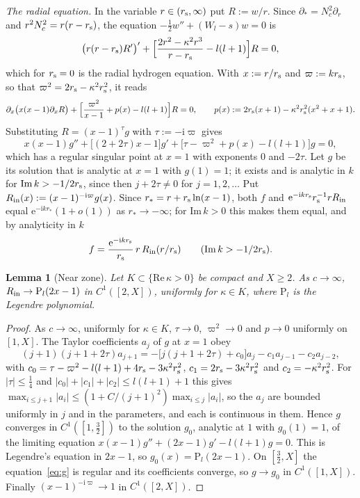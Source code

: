 \documentclass[%
 aip,
 jmp,
 amsmath,amssymb,
 reprint, onecolumn
]{revtex4-1}
\newtheorem{alemma}{Lemma}
\theoremstyle{definition}
\theoremstyle{remark}
\newcommand{\rmi}{\mathrm{i}}
\newcommand{\rme}{\mathrm{e}}
\begin{document}
\emph{The radial equation.} In the variable $r\in(r_{\rm s},\infty)$ put
$R:=w/r$. Since $\partial_*=N_c^2\partial_r$ and $r^2N_c^2=r(r-r_{\rm
s})$, the equation $-\frac12w''+(W_l-s)w=0$ is
\begin{equation}\label{eq:radial-R}
\bigl(r(r-r_{\rm s})R'\bigr)'+\Bigl[\frac{2r^2-\kappa^2r^3}{r-r_{\rm s}}-l(l+1)\Bigr]R=0 ,
\end{equation}
which for $r_{\rm s}=0$ is the radial hydrogen equation. With
$x:=r/r_{\rm s}$ and $\varpi:=kr_{\rm s}$, so that
$\varpi^2=2r_{\rm s}-\kappa^2r_{\rm s}^2$, it reads
\[
\partial_x\bigl(x(x-1)\partial_xR\bigr)+\Bigl[\frac{\varpi^2}{x-1}+p(x)
-l(l+1)\Bigr]R=0,\qquad p(x):=2r_{\rm s}(x+1)-\kappa^2r_{\rm s}^2(x^2+x+1).
\]
Substituting $R=(x-1)^{\tau}g$ with $\tau:=-\rmi\varpi$ gives
\begin{equation}\label{eq:g}
x(x-1)g''+\bigl[(2+2\tau)x-1\bigr]g'+\bigl[\tau-\varpi^2+p(x)-l(l+1)\bigr]
g=0,
\end{equation}
which has a regular singular point at $x=1$ with exponents $0$ and
$-2\tau$. Let $g$ be its solution that is analytic at $x=1$ with
$g(1)=1$; it exists and is analytic in $k$ for
$\mathrm{Im}\,k>-1/2r_{\rm s}$, since then $j+2\tau\neq0$ for
$j=1,2,\dots$ Put $R_{\rm in}(x):=(x-1)^{-\rmi\varpi}g(x)$. Since
$r_*=r+r_{\rm s}\ln(x-1)$, both $f$ and
$\rme^{-\rmi kr_{\rm s}}r_{\rm s}^{-1}rR_{\rm in}$ equal
$\rme^{-\rmi kr_*}(1+o(1))$ as $r_*\to-\infty$; for $\mathrm{Im}\,k>0$
this makes them equal, and by analyticity in $k$
\begin{equation}\label{eq:f-near}
f=\frac{\rme^{-\rmi kr_{\rm s}}}{r_{\rm s}}\,r\,R_{\rm in}(r/r_{\rm s})
\qquad(\mathrm{Im}\,k>-1/2r_{\rm s}).
\end{equation}

\begin{alemma}[Near zone]\label{lem:near}
Let $K\subset\{\mathrm{Re}\,\kappa>0\}$ be compact and $X\geq2$. As
$c\to\infty$, $R_{\rm in}\to\mathrm P_l(2x-1)$ in $C^1([2,X])$,
uniformly for $\kappa\in K$, where $\mathrm P_l$ is the Legendre
polynomial.
\end{alemma}

\begin{proof}
As $c\to\infty$, uniformly for $\kappa\in K$, $\tau\to0$,
$\varpi^2\to0$ and $p\to0$ uniformly on $[1,X]$. The Taylor coefficients
$a_j$ of $g$ at $x=1$ obey
\[
(j+1)(j+1+2\tau)a_{j+1}=-\bigl[j(j+1+2\tau)+c_0\bigr]a_j-c_1a_{j-1}
-c_2a_{j-2},
\]
with $c_0=\tau-\varpi^2-l(l+1)+4r_{\rm s}-3\kappa^2r_{\rm s}^2$,
$c_1=2r_{\rm s}-3\kappa^2r_{\rm s}^2$ and $c_2=-\kappa^2r_{\rm s}^2$. For
$|\tau|\leq\frac14$ and $|c_0|+|c_1|+|c_2|\leq l(l+1)+1$ this gives
$\max_{i\leq j+1}|a_i|\leq(1+C/(j+1)^2)\max_{i\leq j}|a_i|$, so the $a_j$
are bounded uniformly in $j$ and in the parameters, and each is continuous
in them. Hence $g$ converges in $C^1([1,\frac32])$ to the solution $g_0$,
analytic at $1$ with $g_0(1)=1$, of the limiting equation
$x(x-1)g''+(2x-1)g'-l(l+1)g=0$. This is Legendre's equation in $2x-1$, so
$g_0(x)=\mathrm P_l(2x-1)$. On $[\frac32,X]$ the equation~\eqref{eq:g} is
regular and its coefficients converge, so $g\to g_0$ in $C^1([1,X])$.
Finally $(x-1)^{-\rmi\varpi}\to1$ in $C^1([2,X])$.
\end{proof}
\end{document}
